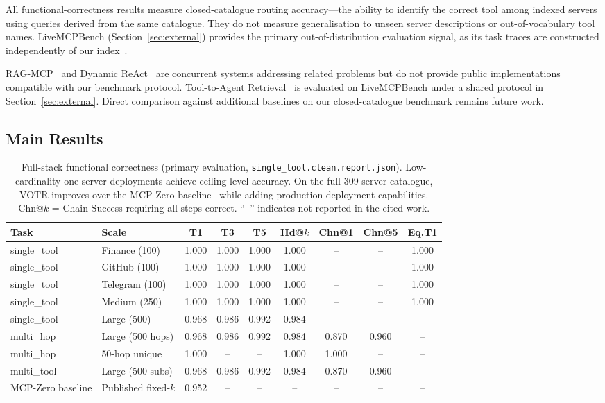 \documentclass[sigconf,anonymous,review]{acmart}
\newcommand{\votr}{\textsc{VOTR}\xspace}
\newcommand{\mcpzero}{MCP-Zero\xspace}
\begin{document}
All functional-correctness results measure closed-catalogue routing
accuracy---the ability to identify the correct tool among indexed servers using
queries derived from the same catalogue.
They do not measure generalisation to unseen server descriptions or
out-of-vocabulary tool names.
LiveMCPBench (Section~\ref{sec:external}) provides the primary out-of-distribution
evaluation signal, as its task traces are constructed independently of our
index~\cite{livemcpbench2025}.

RAG-MCP~\cite{rag_mcp_2025} and Dynamic ReAct~\cite{dynamic_react_2025} are
concurrent systems addressing related problems but do not provide public
implementations compatible with our benchmark protocol.
Tool-to-Agent Retrieval~\cite{tool_to_agent_2025} is evaluated on LiveMCPBench
under a shared protocol in Section~\ref{sec:external}.
Direct comparison against additional baselines on our closed-catalogue benchmark
remains future work.

\subsection{Main Results}

\begin{table}[t]
\centering
\small
\caption{Full-stack functional correctness (primary evaluation,
\texttt{single\_tool.clean.report.json}). Low-cardinality one-server deployments
achieve ceiling-level accuracy. On the full 309-server catalogue, \votr improves
over the \mcpzero baseline~\cite{mcpzero2025} while adding production deployment
capabilities. Chn@$k$ = Chain Success requiring all steps correct.
``--'' indicates not reported in the cited work.}
\label{tab:main}
\begin{tabular}{@{}llccccccc@{}}
\toprule
Task & Scale & T1 & T3 & T5 & Hd@$k$ & Chn@1 & Chn@5 & Eq.T1 \\
\midrule
single\_tool & Finance (100)     & 1.000 & 1.000 & 1.000 & 1.000 & --    & --    & 1.000 \\
single\_tool & GitHub (100)      & 1.000 & 1.000 & 1.000 & 1.000 & --    & --    & 1.000 \\
single\_tool & Telegram (100)    & 1.000 & 1.000 & 1.000 & 1.000 & --    & --    & 1.000 \\
single\_tool & Medium (250)      & 1.000 & 1.000 & 1.000 & 1.000 & --    & --    & 1.000 \\
single\_tool & Large (500)       & 0.968 & 0.986 & 0.992 & 0.984 & --    & --    & -- \\
multi\_hop   & Large (500 hops)  & 0.968 & 0.986 & 0.992 & 0.984 & 0.870 & 0.960 & -- \\
multi\_hop   & 50-hop unique     & 1.000 & --    & --    & 1.000 & 1.000 & --    & -- \\
multi\_tool  & Large (500 subs)  & 0.968 & 0.986 & 0.992 & 0.984 & 0.870 & 0.960 & -- \\
\mcpzero baseline & Published fixed-$k$ & 0.952 & -- & -- & -- & -- & -- & -- \\
\bottomrule
\end{tabular}
\end{table}
\end{document}

